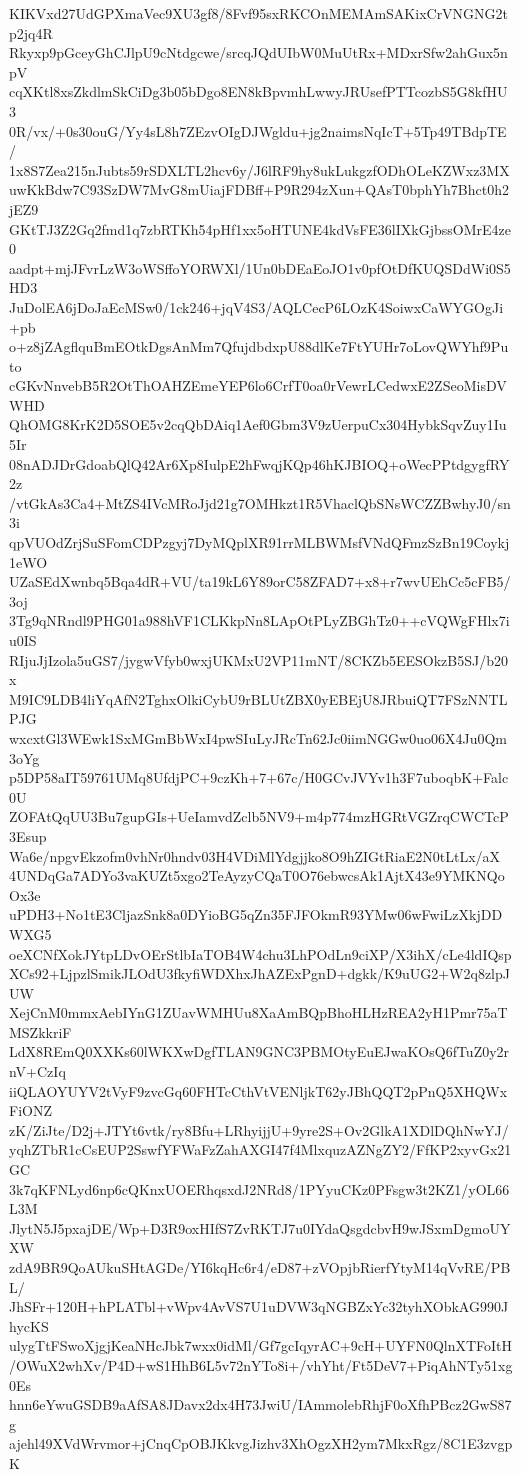 KIKVxd27UdGPXmaVec9XU3gf8/8Fvf95sxRKCOnMEMAmSAKixCrVNGNG2tp2jq4R
Rkyxp9pGceyGhCJlpU9cNtdgcwe/srcqJQdUIbW0MuUtRx+MDxrSfw2ahGux5npV
cqXKtl8xsZkdlmSkCiDg3b05bDgo8EN8kBpvmhLwwyJRUsefPTTcozbS5G8kfHU3
0R/vx/+0s30ouG/Yy4sL8h7ZEzvOIgDJWgldu+jg2naimsNqIcT+5Tp49TBdpTE/
1x8S7Zea215nJubts59rSDXLTL2hcv6y/J6lRF9hy8ukLukgzfODhOLeKZWxz3MX
uwKkBdw7C93SzDW7MvG8mUiajFDBff+P9R294zXun+QAsT0bphYh7Bhct0h2jEZ9
GKtTJ3Z2Gq2fmd1q7zbRTKh54pHf1xx5oHTUNE4kdVsFE36lIXkGjbssOMrE4ze0
aadpt+mjJFvrLzW3oWSffoYORWXl/1Un0bDEaEoJO1v0pfOtDfKUQSDdWi0S5HD3
JuDolEA6jDoJaEcMSw0/1ck246+jqV4S3/AQLCecP6LOzK4SoiwxCaWYGOgJi+pb
o+z8jZAgflquBmEOtkDgsAnMm7QfujdbdxpU88dlKe7FtYUHr7oLovQWYhf9Puto
cGKvNnvebB5R2OtThOAHZEmeYEP6lo6CrfT0oa0rVewrLCedwxE2ZSeoMisDVWHD
QhOMG8KrK2D5SOE5v2cqQbDAiq1Aef0Gbm3V9zUerpuCx304HybkSqvZuy1Iu5Ir
08nADJDrGdoabQlQ42Ar6Xp8IulpE2hFwqjKQp46hKJBIOQ+oWecPPtdgygfRY2z
/vtGkAs3Ca4+MtZS4IVcMRoJjd21g7OMHkzt1R5VhaclQbSNsWCZZBwhyJ0/sn3i
qpVUOdZrjSuSFomCDPzgyj7DyMQplXR91rrMLBWMsfVNdQFmzSzBn19Coykj1eWO
UZaSEdXwnbq5Bqa4dR+VU/ta19kL6Y89orC58ZFAD7+x8+r7wvUEhCc5cFB5/3oj
3Tg9qNRndl9PHG01a988hVF1CLKkpNn8LApOtPLyZBGhTz0++cVQWgFHlx7iu0IS
RIjuJjIzola5uGS7/jygwVfyb0wxjUKMxU2VP11mNT/8CKZb5EESOkzB5SJ/b20x
M9IC9LDB4liYqAfN2TghxOlkiCybU9rBLUtZBX0yEBEjU8JRbuiQT7FSzNNTLPJG
wxcxtGl3WEwk1SxMGmBbWxI4pwSIuLyJRcTn62Jc0iimNGGw0uo06X4Ju0Qm3oYg
p5DP58aIT59761UMq8UfdjPC+9czKh+7+67c/H0GCvJVYv1h3F7uboqbK+Falc0U
ZOFAtQqUU3Bu7gupGIs+UeIamvdZclb5NV9+m4p774mzHGRtVGZrqCWCTcP3Esup
Wa6e/npgvEkzofm0vhNr0hndv03H4VDiMlYdgjjko8O9hZIGtRiaE2N0tLtLx/aX
4UNDqGa7ADYo3vaKUZt5xgo2TeAyzyCQaT0O76ebwcsAk1AjtX43e9YMKNQoOx3e
uPDH3+No1tE3CljazSnk8a0DYioBG5qZn35FJFOkmR93YMw06wFwiLzXkjDDWXG5
oeXCNfXokJYtpLDvOErStlbIaTOB4W4chu3LhPOdLn9ciXP/X3ihX/cLe4ldIQsp
XCs92+LjpzlSmikJLOdU3fkyfiWDXhxJhAZExPgnD+dgkk/K9uUG2+W2q8zlpJUW
XejCnM0mmxAebIYnG1ZUavWMHUu8XaAmBQpBhoHLHzREA2yH1Pmr75aTMSZkkriF
LdX8REmQ0XXKs60lWKXwDgfTLAN9GNC3PBMOtyEuEJwaKOsQ6fTuZ0y2rnV+CzIq
iiQLAOYUYV2tVyF9zvcGq60FHTcCthVtVENljkT62yJBhQQT2pPnQ5XHQWxFiONZ
zK/ZiJte/D2j+JTYt6vtk/ry8Bfu+LRhyijjU+9yre2S+Ov2GlkA1XDlDQhNwYJ/
yqhZTbR1cCsEUP2SswfYFWaFzZahAXGI47f4MlxquzAZNgZY2/FfKP2xyvGx21GC
3k7qKFNLyd6np6cQKnxUOERhqsxdJ2NRd8/1PYyuCKz0PFsgw3t2KZ1/yOL66L3M
JlytN5J5pxajDE/Wp+D3R9oxHIfS7ZvRKTJ7u0IYdaQsgdcbvH9wJSxmDgmoUYXW
zdA9BR9QoAUkuSHtAGDe/YI6kqHc6r4/eD87+zVOpjbRierfYtyM14qVvRE/PBL/
JhSFr+120H+hPLATbl+vWpv4AvVS7U1uDVW3qNGBZxYc32tyhXObkAG990JhycKS
ulygTtFSwoXjgjKeaNHcJbk7wxx0idMl/Gf7gcIqyrAC+9cH+UYFN0QlnXTFoItH
/OWuX2whXv/P4D+wS1HhB6L5v72nYTo8i+/vhYht/Ft5DeV7+PiqAhNTy51xg0Es
hnn6eYwuGSDB9aAfSA8JDavx2dx4H73JwiU/IAmmolebRhjF0oXfhPBcz2GwS87g
ajehl49XVdWrvmor+jCnqCpOBJKkvgJizhv3XhOgzXH2ym7MkxRgz/8C1E3zvgpK

